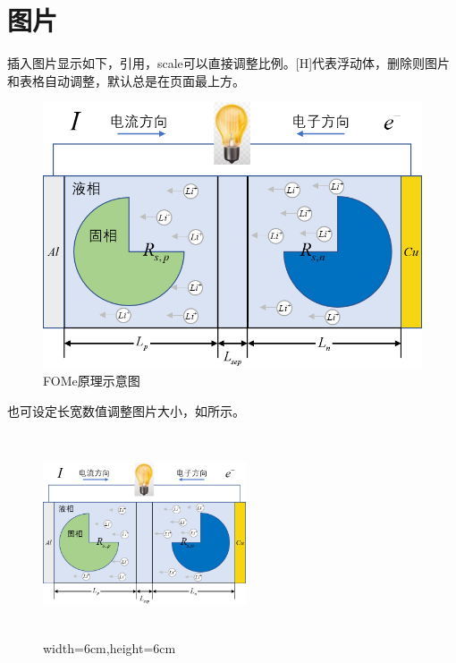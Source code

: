 \section{图片}
插入图片显示如下，引用，scale可以直接调整比例。[H]代表浮动体，删除则图片和表格自动调整，默认总是在页面最上方。
\begin{figure}[H]
\centering
\includegraphics[scale=0.75]{figure/chap1/Li-ion.png}
\caption{FOMe原理示意图}
\label{fig5-1}
\end{figure}
也可设定长宽数值调整图片大小，如所示。
\begin{figure}[H]
\centering
\includegraphics[width=6cm,height=6cm]{figure/chap1/Li-ion.png}
\caption{width=6cm,height=6cm}
\label{fig1-2}
\end{figure}

